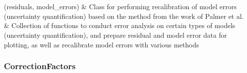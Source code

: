 \documentclass[letterpaper,10pt,english]{sphinxmanual}
\begin{document}
\begin{savenotes}\sphinxatlongtablestart\begin{longtable}[c]{}
\hline

\endfirsthead

%
{}\\
\hline

\endhead

\hline
{}\\
\endfoot

\endlastfoot

{\hyperref[\detokenize{api/mastml.error_analysis.CorrectionFactors:mastml.error_analysis.CorrectionFactors}]{}}(residuals, model\_errors)
&
Class for performing recalibration of model errors (uncertainty quantification) based on the method from the work of Palmer et al.
\\
\hline
{\hyperref[\detokenize{api/mastml.error_analysis.ErrorUtils:mastml.error_analysis.ErrorUtils}]{}}
&
Collection of functions to conduct error analysis on certain types of models (uncertainty quantification), and prepare residual and model error data for plotting, as well as recalibrate model errors with various methods
\\
\hline
\end{longtable}\sphinxatlongtableend\end{savenotes}


\subsubsection{CorrectionFactors}
\label{\detokenize{api/mastml.error_analysis.CorrectionFactors:correctionfactors}}\label{\detokenize{api/mastml.error_analysis.CorrectionFactors::doc}}
\end{document}
